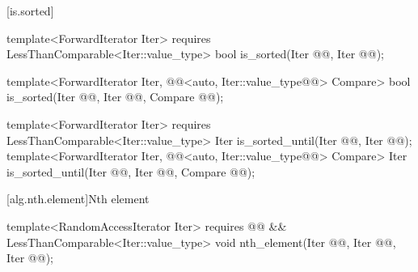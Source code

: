 \documentclass[american,twoside]{book}
\begin{document}
\begin{paras}
[is.sorted]{}

%
\color{addclr}
\begin{itemdecl}
template<ForwardIterator Iter>
  requires LessThanComparable<Iter::value_type>
  bool is_sorted(Iter @@, Iter @@);
\end{itemdecl}
\color{black}

\begin{itemdescr}
\pnum
{}
\end{itemdescr}

%
\color{addclr}
\begin{itemdecl}
template<ForwardIterator Iter, 
         @@<auto, Iter::value_type@@> Compare>
  bool is_sorted(Iter @@, Iter @@,
                 Compare @@);
\end{itemdecl}
\color{black}

\begin{itemdescr}
\pnum
{}
\end{itemdescr}

%
\color{addclr}
\begin{itemdecl}
template<ForwardIterator Iter>
  requires LessThanComparable<Iter::value_type>
  Iter is_sorted_until(Iter @@, Iter @@);
template<ForwardIterator Iter, 
         @@<auto, Iter::value_type@@> Compare>
  Iter is_sorted_until(Iter @@, Iter @@,
                       Compare @@);
\end{itemdecl}
\color{black}

\begin{itemdescr}
\pnum
{}

\pnum
{}
\end{itemdescr}

[alg.nth.element]{Nth element}

%
\color{addclr}\begin{itemdecl}
template<RandomAccessIterator Iter>
  requires @@ &&
           LessThanComparable<Iter::value_type>
  void nth_element(Iter @@, Iter @@,
                   Iter @@);


\end{itemdecl}
\end{paras}
\end{document}
